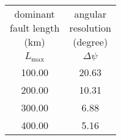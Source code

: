 \begin{tabular}{cc}
\makecell{dominant \\fault length\\ (km)} & \makecell{angular \\ resolution \\ (degree)}\\
$L_{\text{max}}$ & $\Delta\psi$\\
100.00 & 20.63\\
200.00 & 10.31\\
300.00 & 6.88\\
400.00 & 5.16\\
\end{tabular}
